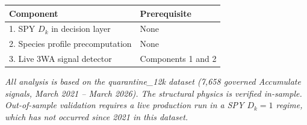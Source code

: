\documentclass[11pt, a4paper]{article}
\theoremstyle{definition}
\begin{document}
\vspace{1em}
\begin{center}
\begin{tabular}{ll}
\toprule
\textbf{Component} & \textbf{Prerequisite} \\
\midrule
1. SPY $D_k$ in decision layer   & None \\
2. Species profile precomputation & None \\
3. Live 3WA signal detector       & Components 1 and 2 \\
\bottomrule
\end{tabular}
\end{center}

\vspace{2em}
\noindent\textit{All analysis is based on the quarantine\_12k dataset
(7{,}658 governed Accumulate signals, March 2021 -- March 2026).
The structural physics is verified in-sample. Out-of-sample validation
requires a live production run in a SPY $D_k = 1$ regime, which has not
occurred since 2021 in this dataset.}
\end{document}
